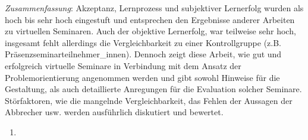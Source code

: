 \documentclass[12pt, bibliography=totoc]{scrartcl}
\begin{document}
\emph{Zusammenfassung}: Akzeptanz, Lernprozess und subjektiver
Lernerfolg wurden als hoch bis sehr hoch eingestuft und entsprechen den
Ergebnisse anderer Arbeiten zu virtuellen Seminaren. Auch der objektive
Lernerfolg, war teilweise sehr hoch, insgesamt fehlt allerdings die
Vergleichbarkeit zu einer Kontrollgruppe (z.B.
Präsenzseminarteilnehmer\_innen). Dennoch zeigt diese Arbeit, wie gut
und erfolgreich virtuelle Seminare in Verbindung mit dem Ansatz der
Problemorientierung angenommen werden und gibt sowohl Hinweise für die
Gestaltung, als auch detaillierte Anregungen für die Evaluation solcher
Seminare. Störfaktoren, wie die mangelnde Vergleichbarkeit, das Fehlen
der Aussagen der Abbrecher usw. werden ausführlich diskutiert und
bewertet.

\begin{enumerate}
\def\labelenumi{\arabic{enumi}.}
\setcounter{enumi}{3}
\itemsep1pt\parskip0pt
\item
  \textbf{}
\end{enumerate}
\end{document}
